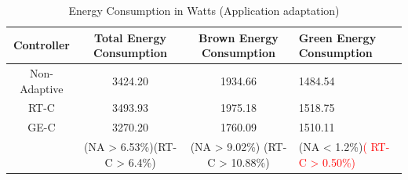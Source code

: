 
\begin{table}
\caption{Energy Consumption in Watts (Application adaptation)}
  \label{tab:watt1}
\begin{tabular}{cccl}
\toprule
Controller & Total Energy Consumption & Brown Energy Consumption & Green Energy Consumption\\
\midrule
Non-Adaptive & 3424.20 & 1934.66 & 1484.54 \\
RT-C & 3493.93 & 1975.18 & 1518.75  \\  %
GE-C & 3270.20  & 1760.09  & 1510.11 \\
  & (NA > 6.53\%)(RT-C > 6.4\%) & (NA > 9.02\%) (RT-C > 10.88\%) & (NA < 1.2\%)\textcolor{red}{( RT-C > 0.50\%)} \\

\bottomrule
\end{tabular}
\end{table}



